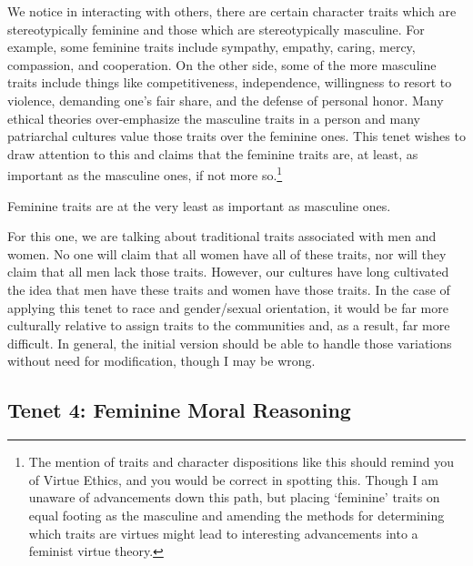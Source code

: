 We notice in interacting with others, there are certain character traits which are stereotypically feminine and those which are stereotypically masculine. For example, some feminine traits include sympathy, empathy, caring, mercy, compassion, and cooperation. On the other side, some of the more masculine traits include things like competitiveness, independence, willingness to resort to violence, demanding one’s fair share, and the defense of personal honor. Many ethical theories over-emphasize the masculine traits in a person and many patriarchal cultures value those traits over the feminine ones. This tenet wishes to draw attention to this and claims that the feminine traits are, at least, as important as the masculine ones, if not more so.\footnote{The mention of traits and character dispositions like this should remind you of Virtue Ethics, and you would be correct in spotting this. Though I am unaware of advancements down this path, but placing `feminine' traits on equal footing as the masculine and amending the methods for determining which traits are virtues might lead to interesting advancements into a feminist virtue theory.}
\begin{center}
Feminine traits are at the very least as important as masculine ones.
\end{center}
For this one, we are talking about traditional traits associated with men and women. No one will claim that all women have all of these traits, nor will they claim that all men lack those traits. However, our cultures have long cultivated the idea that men have these traits and women have those traits. In the case of applying this tenet to race and gender/sexual orientation, it would be far more culturally relative to assign traits to the communities and, as a result, far more difficult. In general, the initial version should be able to handle those variations without need for modification, though I may be wrong.

\subsection{Tenet 4: Feminine Moral Reasoning}


